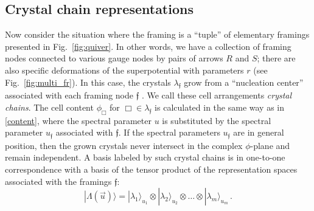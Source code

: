 \documentclass[10pt]{article}
\theoremstyle{definition}
\def\ff{\mathfrak{f}}
\numberwithin{equation}{section}
\begin{document}
\subsection{Crystal chain representations}\label{sec:cry_chain}

Now consider the situation where the framing is a ``tuple'' of elementary framings presented in Fig.~\ref{fig:quiver}.
In other words, we have a collection of framing nodes connected to various gauge nodes by pairs of arrows $R$ and $S$; there are also specific deformations of the superpotential with parameters $r$ (see Fig.~\ref{fig:multi_fr}).	
In this case, the crystals $\lambda_{\ff}$ grow from a ``nucleation center'' associated with each framing node $\ff$ \cite{Galakhov:2021xum,Galakhov:2022uyu}.
We call these cell arrangements \emph{crystal chains}.
The cell content $\phi_{\Box}$ for $\Box\in\lambda_{\ff}$ is calculated in the same way as in \eqref{content}, where the spectral parameter $u$ is substituted by the spectral parameter  $u_{\ff}$ associated with $\ff$.
If the spectral parameters $u_{\ff}$ are in general position, then the grown crystals never intersect in the complex $\phi$-plane and remain independent.
A basis labeled by such crystal chains is in one-to-one correspondence with a basis of the tensor product of the representation spaces associated with the framings $\ff$:
\begin{equation}
	|\Lambda({\vec u})\rangle=|\lambda_1\rangle_{u_1}\otimes |\lambda_2\rangle_{u_2}\otimes \ldots \otimes |\lambda_m\rangle_{u_m}\,.
\end{equation}
\end{document}

